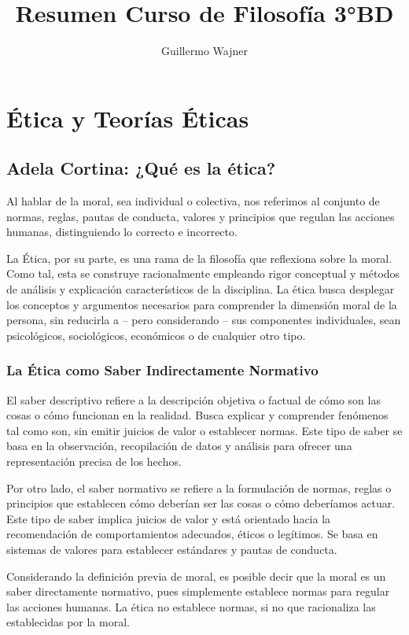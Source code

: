 \documentclass{article}
\title{Resumen Curso de Filosofía 3°BD}
\author{Guillermo Wajner}
\begin{document}
\maketitle

\section{Ética y Teorías Éticas}


\subsection{Adela Cortina: ¿Qué es la ética?}

Al hablar de la moral, sea individual o colectiva, nos referimos al conjunto de normas, reglas, pautas de conducta, valores y principios que regulan las acciones humanas, distinguiendo lo correcto e incorrecto.

La Ética, por su parte, es una rama de la filosofía que reflexiona sobre la moral. Como tal, esta se construye racionalmente empleando rigor conceptual y métodos de análisis y explicación característicos de la disciplina. La ética busca desplegar los conceptos y argumentos necesarios para comprender la dimensión moral de la persona, sin reducirla a -- pero considerando -- sus componentes individuales, sean psicológicos, sociológicos, económicos o de cualquier otro tipo.



\subsubsection{La Ética como Saber Indirectamente Normativo}

El saber descriptivo refiere a la descripción objetiva o factual de cómo son las cosas o cómo funcionan en la realidad. Busca explicar y comprender fenómenos tal como son, sin emitir juicios de valor o establecer normas. Este tipo de saber se basa en la observación, recopilación de datos y análisis para ofrecer una representación precisa de los hechos.

Por otro lado, el saber normativo se refiere a la formulación de normas, reglas o principios que establecen cómo deberían ser las cosas o cómo deberíamos actuar. Este tipo de saber implica juicios de valor y está orientado hacia la recomendación de comportamientos adecuados, éticos o legítimos. Se basa en sistemas de valores para establecer estándares y pautas de conducta.

Considerando la definición previa de moral, es posible decir que la moral es un saber directamente normativo, pues simplemente establece normas para regular las acciones humanas. La ética no establece normas, si no que racionaliza las establecidas por la moral. 
\end{document}
